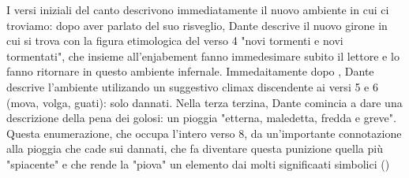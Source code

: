 \documentclass[10pt,a4paper]{article}
\begin{document}
	I versi iniziali del canto descrivono immediatamente il nuovo ambiente in cui ci troviamo: dopo aver parlato del suo risveglio, Dante descrive il nuovo girone in cui si trova con la figura etimologica del verso 4 "novi tormenti e novi tormentati", che insieme all'enjabement fanno immedesimare subito il lettore e lo fanno ritornare in questo ambiente infernale. Immedaitamente dopo , Dante descrive l'ambiente utilizando un suggestivo climax discendente ai versi 5 e 6 (mova, volga, guati): solo dannati. Nella terza terzina, Dante comincia a dare una descrizione della pena dei golosi: un pioggia "etterna, maledetta, fredda e greve". Questa enumerazione, che occupa l'intero verso 8, da un'importante connotazione alla pioggia che cade sui dannati, che fa diventare questa punizione quella più "spiacente" e che rende la "piova" un elemento dai molti significaati simbolici ()
	
\end{document}

